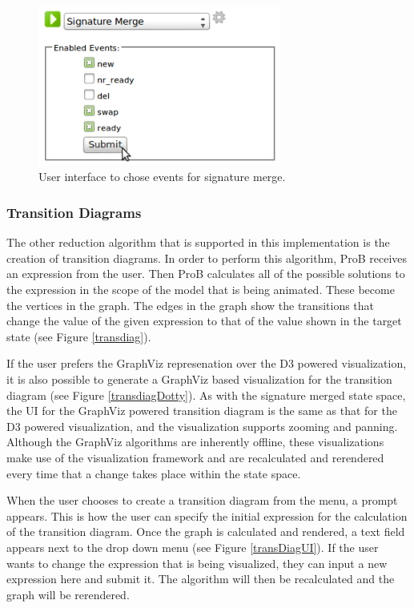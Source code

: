 \begin{center}
\begin{figure}[h!]
\centering
\includegraphics[width=8cm]{bilder/sigMergeUI.png}
\caption{User interface to chose events for signature merge.}
\label{sigMergeUI}
\end{figure}
\end{center}


\subsubsection{Transition Diagrams}


The other reduction algorithm that is supported in this implementation is the creation of transition diagrams. In order to perform this algorithm, ProB receives an expression from the user. Then ProB calculates all of the possible solutions to the expression in the scope of the model that is being animated. These become the vertices in the graph. The edges in the graph show the transitions that change the value of the given expression to that of the value shown in the target state (see Figure \ref{transdiag}).

If the user prefers the GraphViz represenation over the D3 powered visualization, it is also possible to generate a GraphViz based visualization for the transition diagram (see Figure \ref{transdiagDotty}). As with the signature merged state space, the UI for the GraphViz powered transition diagram is the same as that for the D3 powered visualization, and the visualization supports zooming and panning. Although the GraphViz algorithms are inherently offline, these visualizations make use of the visualization framework and are recalculated and rerendered every time that a change takes place within the state space.

When the user chooses to create a transition diagram from the menu, a prompt appears. This is how the user can specify the initial expression for the calculation of the transition diagram. Once the graph is calculated and rendered, a text field appears next to the drop down menu (see Figure \ref{transDiagUI}). If the user wants to change the expression that is being visualized, they can input a new expression here and submit it. The algorithm will then be recalculated and the graph will be rerendered.

